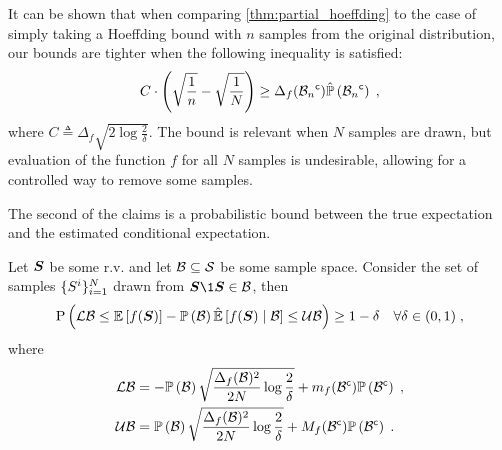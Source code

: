 It can be shown that when comparing \cref{thm:partial_hoeffding} to the case of simply taking a Hoeffding bound with $n$ samples from the original distribution, our bounds are tighter when the following inequality is satisfied:
\begin{equation}
	C\cdot\left(\sqrt{\frac{1}{n}}-\sqrt{\frac{1}{N}}\right)\geq\Delta_f({\mathcal B_n}^{\mathsf{c}})\hat{\mathbb{P}}\left({{\mathcal B_n}^{\mathsf{c}}}\right)\;,
\end{equation}
where $C\triangleq \Delta_f\sqrt{2\log\frac{2}{\delta}}$. The bound is relevant when $N$ samples are drawn, but evaluation of the function $f$ for all $N$ samples is undesirable, allowing for a controlled way to remove some samples.

The second of the claims is a probabilistic bound between the true expectation and the estimated conditional expectation.
\begin{theoremE}
	\label{thm:conditional_hoeffding}
	Let $\boldsymbol S$ be some r.v. and let $\mathcal B\subseteq\mathcal S$ be some sample space. Consider the set of samples $\{S^i\}_{i=1}^N$ drawn from $\RV\1{\RV\in\subSpace}$, then
	\begin{align*}
		\mathrm{P}\left({\operatorname*{\mathcal{LB}}\leq\operatorname*{\mathbb{E}}\limits_{}\left[{f(\boldsymbol S)}\right]-\mathbb{P}\left({\mathcal B}\right)\operatorname*{\hat{\operatorname*{\mathbb{E}}}}\limits_{}\left[{f(\boldsymbol S)}\mid{\ensuremath{\mathcal B}}\right]\leq\operatorname*{\mathcal{UB}}}\right)\geq1-\delta&&\forall\delta\in(0,1)\;,
	\end{align*}
	where
	\begin{subequations}
		\begin{align}
			\operatorname*{\mathcal{LB}} & =-\mathbb{P}\left({\mathcal B}\right)\sqrt{\frac{\Delta_f(\mathcal B)^2}{2N}\log\frac{2}{\delta}}+m_f({\mathcal B}^{\mathsf{c}})\mathbb{P}\left({{\mathcal B}^{\mathsf{c}}}\right)\;, \\
			\operatorname*{\mathcal{UB}} & =\mathbb{P}\left({\mathcal B}\right)\sqrt{\frac{\Delta_f(\mathcal B)^2}{2N}\log\frac{2}{\delta}}+M_f({\mathcal B}^{\mathsf{c}})\mathbb{P}\left({{\mathcal B}^{\mathsf{c}}}\right)\;.
		\end{align}
	\end{subequations}
\end{theoremE}
